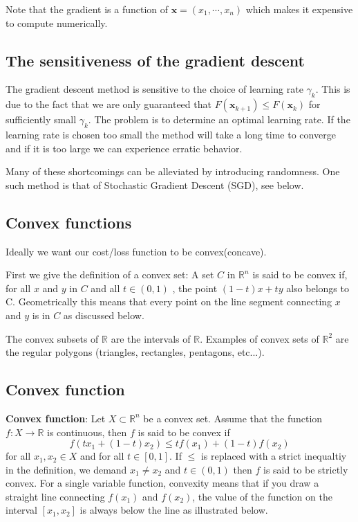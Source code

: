 \documentclass[%
oneside,                 %
final,                   %
10pt]{article}
\begin{document}
Note that the gradient is a function of $\mathbf{x} =
(x_1,\cdots,x_n)$ which makes it expensive to compute numerically.


\subsection{The sensitiveness of the gradient descent}

The gradient descent method 
is sensitive to the choice of learning rate $\gamma_k$. This is due
to the fact that we are only guaranteed that $F(\mathbf{x}_{k+1}) \leq
F(\mathbf{x}_k)$ for sufficiently small $\gamma_k$. The problem is to
determine an optimal learning rate. If the learning rate is chosen too
small the method will take a long time to converge and if it is too
large we can experience erratic behavior.

Many of these shortcomings can be alleviated by introducing
randomness. One such method is that of Stochastic Gradient Descent
(SGD), see below.


\subsection{Convex functions}

Ideally we want our cost/loss function to be convex(concave).

First we give the definition of a convex set: A set $C$ in
$\mathbb{R}^n$ is said to be convex if, for all $x$ and $y$ in $C$ and
all $t \in (0,1)$ , the point $(1 − t)x + ty$ also belongs to
C. Geometrically this means that every point on the line segment
connecting $x$ and $y$ is in $C$ as discussed below.

The convex subsets of $\mathbb{R}$ are the intervals of
$\mathbb{R}$. Examples of convex sets of $\mathbb{R}^2$ are the
regular polygons (triangles, rectangles, pentagons, etc...).

\subsection{Convex function}

\textbf{Convex function}: Let $X \subset \mathbb{R}^n$ be a convex set. Assume that the function $f: X \rightarrow \mathbb{R}$ is continuous, then $f$ is said to be convex if $$f(tx_1 + (1-t)x_2) \leq tf(x_1) + (1-t)f(x_2) $$ for all $x_1, x_2 \in X$ and for all $t \in [0,1]$. If $\leq$ is replaced with a strict inequaltiy in the definition, we demand $x_1 \neq x_2$ and $t\in(0,1)$ then $f$ is said to be strictly convex. For a single variable function, convexity means that if you draw a straight line connecting $f(x_1)$ and $f(x_2)$, the value of the function on the interval $[x_1,x_2]$ is always below the line as illustrated below.
\end{document}
